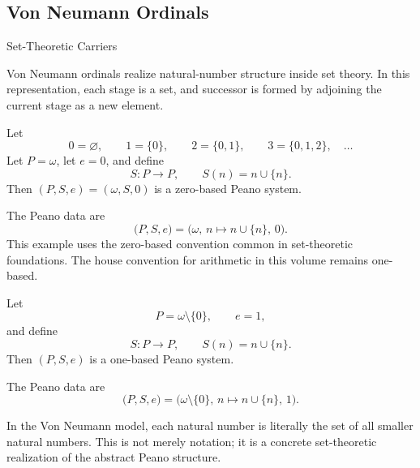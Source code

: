 \subsection*{Von Neumann Ordinals}

\begin{topicbox}{Set-Theoretic Carriers}
\begin{exposition}
Von Neumann ordinals realize natural-number structure inside set theory. In
this representation, each stage is a set, and successor is formed by adjoining
the current stage as a new element.
\end{exposition}

\begin{example*}
Let
\[
0=\varnothing,\qquad 1=\{0\},\qquad 2=\{0,1\},\qquad
3=\{0,1,2\},\quad \ldots
\]
Let $P=\omega$, let $e=0$, and define
\[
S:P\to P,
\qquad
S(n)=n\cup\{n\}.
\]
Then $(P,S,e)=(\omega,S,0)$ is a zero-based Peano system.
\end{example*}

\begin{remark*}[Structure]
The Peano data are
\[
\bigl(P,S,e\bigr)
=
\bigl(\omega,\,n\mapsto n\cup\{n\},\,0\bigr).
\]
This example uses the zero-based convention common in set-theoretic
foundations. The house convention for arithmetic in this volume remains
one-based.
\end{remark*}

\begin{example*}
Let
\[
P=\omega\setminus\{0\}, \qquad e=1,
\]
and define
\[
S:P\to P,
\qquad
S(n)=n\cup\{n\}.
\]
Then $(P,S,e)$ is a one-based Peano system.
\end{example*}

\begin{remark*}[Structure]
The Peano data are
\[
\bigl(P,S,e\bigr)
=
\bigl(\omega\setminus\{0\},\,n\mapsto n\cup\{n\},\,1\bigr).
\]
\end{remark*}

\begin{remark*}[Interpretation]
In the Von Neumann model, each natural number is literally the set of all
smaller natural numbers. This is not merely notation; it is a concrete
set-theoretic realization of the abstract Peano structure.
\end{remark*}
\end{topicbox}

